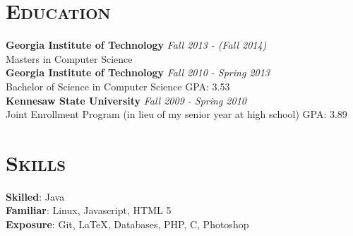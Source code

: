 
\hypersetup{backref,pdfpagemode=Full,colorlinks=true,backref}

\addtolength{\oddsidemargin}{-0.45in}
\addtolength{\voffset}{-0.15in}
\addtolength{\textwidth}{1.00in} \addtolength{\textheight}{1.50in}

\renewcommand{\namefont}{\LARGE\emph}



\address{kyldvs@gmail.com}

\begin{resume}

%

\section{\textsc{Education}}

\textbf{Georgia Institute of Technology} \hfill \emph{Fall 2013 - (Fall 2014)} \\
Masters in Computer Science \\
\newline
\textbf{Georgia Institute of Technology} \hfill \emph{Fall 2010 - Spring 2013} \\
Bachelor of Science in Computer Science \hfill GPA: 3.53 \\
\newline
\textbf{Kennesaw State University} \hfill \emph{Fall 2009 - Spring 2010} \\
Joint Enrollment Program (in lieu of my senior year at high school) \hfill GPA: 3.89

\section{\textsc{Skills}}

\small{\textbf{Skilled}: }\normalsize{Java}\\
\small{\textbf{Familiar}: }\normalsize{Linux, Javascript, HTML 5}\\
\small{\textbf{Exposure}: }\normalsize{Git, \LaTeX, Databases, PHP, C, Photoshop}


\end{resume}
